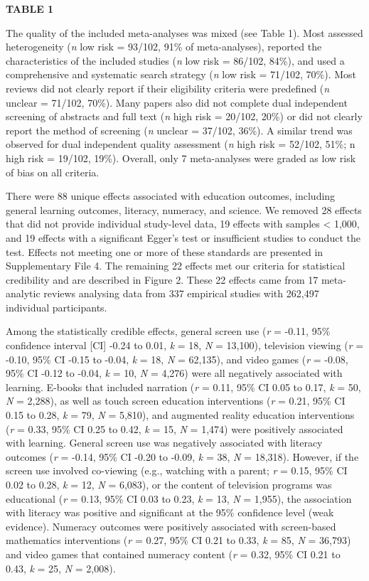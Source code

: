 \documentclass[
  english,
  man]{apa6}
\begin{document}
\textbf{TABLE 1}

The quality of the included meta-analyses was mixed (see Table 1).
Most assessed heterogeneity (\emph{n} low risk = 93/102, 91\% of meta-analyses), reported the characteristics of the included studies (\emph{n} low risk = 86/102, 84\%), and used a comprehensive and systematic search strategy (\emph{n} low risk = 71/102, 70\%).
Most reviews did not clearly report if their eligibility criteria were predefined (\emph{n} unclear = 71/102, 70\%).
Many papers also did not complete dual independent screening of abstracts and full text (\emph{n} high risk = 20/102, 20\%) or did not clearly report the method of screening (\emph{n} unclear = 37/102, 36\%).
A similar trend was observed for dual independent quality assessment (\emph{n} high risk = 52/102, 51\%; n high risk = 19/102, 19\%).
Overall, only 7 meta-analyses were graded as low risk of bias on all criteria.

There were 88 unique effects associated with education outcomes, including general learning outcomes, literacy, numeracy, and science.
We removed 28 effects that did not provide individual study-level data, 19 effects with samples \textless{} 1,000, and 19 effects with a significant Egger's test or insufficient studies to conduct the test.
Effects not meeting one or more of these standards are presented in Supplementary File 4.
The remaining 22 effects met our criteria for statistical credibility and are described in Figure 2.
These 22 effects came from 17 meta-analytic reviews analysing data from 337 empirical studies with 262,497 individual participants.

Among the statistically credible effects, general screen use (\emph{r} = -0.11, 95\% confidence interval {[}CI{]} -0.24 to 0.01, \emph{k} = 18, \emph{N} = 13,100), television viewing (\emph{r} = -0.10, 95\% CI -0.15 to -0.04, \emph{k} = 18, \emph{N} = 62,135), and video games (\emph{r} = -0.08, 95\% CI -0.12 to -0.04, \emph{k} = 10, \emph{N} = 4,276) were all negatively associated with learning.
E-books that included narration (\emph{r} = 0.11, 95\% CI 0.05 to 0.17, \emph{k} = 50, \emph{N} = 2,288), as well as touch screen education interventions (\emph{r} = 0.21, 95\% CI 0.15 to 0.28, \emph{k} = 79, \emph{N} = 5,810), and augmented reality education interventions (\emph{r} = 0.33, 95\% CI 0.25 to 0.42, \emph{k} = 15, \emph{N} = 1,474) were positively associated with learning.
General screen use was negatively associated with literacy outcomes (\emph{r} = -0.14, 95\% CI -0.20 to -0.09, \emph{k} = 38, \emph{N} = 18,318).
However, if the screen use involved co-viewing (e.g., watching with a parent; \emph{r} = 0.15, 95\% CI 0.02 to 0.28, \emph{k} = 12, \emph{N} = 6,083), or the content of television programs was educational (\emph{r} = 0.13, 95\% CI 0.03 to 0.23, \emph{k} = 13, \emph{N} = 1,955), the association with literacy was positive and significant at the 95\% confidence level (weak evidence).
Numeracy outcomes were positively associated with screen-based mathematics interventions (\emph{r} = 0.27, 95\% CI 0.21 to 0.33, \emph{k} = 85, \emph{N} = 36,793) and video games that contained numeracy content (\emph{r} = 0.32, 95\% CI 0.21 to 0.43, \emph{k} = 25, \emph{N} = 2,008).
\end{document}
